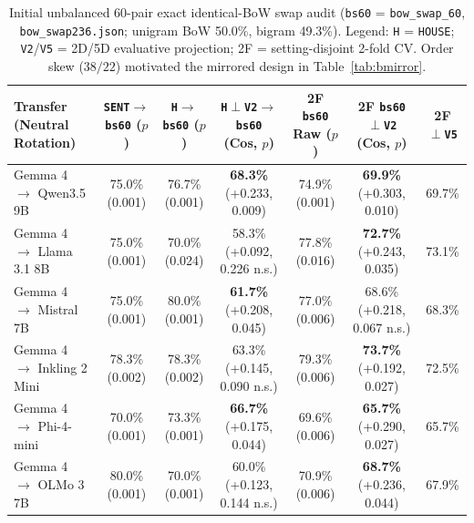 \documentclass[conference]{IEEEtran}
\begin{document}
\begin{table}[t]
\centering
\caption{Initial unbalanced 60-pair exact identical-BoW swap audit (\texttt{bs60} = \texttt{bow\_swap\_60}, \texttt{bow\_swap236.json}; unigram BoW 50.0\%, bigram 49.3\%). Legend: \texttt{H} = \texttt{HOUSE}; \texttt{V2}/\texttt{V5} = 2D/5D evaluative projection; 2F = setting-disjoint 2-fold CV. Order skew ($38/22$) motivated the mirrored design in Table~\ref{tab:bmirror}.}
\label{tab:bswap}
\scriptsize
\setlength{\tabcolsep}{3.0pt}
\begin{tabular}{@{}lcccccc@{}}
\toprule
\textbf{Transfer (Neutral Rotation)} & \textbf{\texttt{SENT}$\to$\texttt{bs60} ($p$)} & \textbf{\texttt{H}$\to$\texttt{bs60} ($p$)} & \textbf{\texttt{H}$\perp$\texttt{V2}$\to$\texttt{bs60} (Cos, $p$)} & \textbf{2F \texttt{bs60} Raw ($p$)} & \textbf{2F \texttt{bs60}$\perp$\texttt{V2} (Cos, $p$)} & \textbf{2F $\perp$\texttt{V5}} \\
\midrule
Gemma 4 $\to$ Qwen3.5 9B & 75.0\% (0.001) & 76.7\% (0.001) & \textbf{68.3\%} (+0.233, 0.009) & 74.9\% (0.001) & \textbf{69.9\%} (+0.303, 0.010) & 69.7\% \\
Gemma 4 $\to$ Llama 3.1 8B & 75.0\% (0.001) & 70.0\% (0.024) & 58.3\% (+0.092, 0.226 n.s.) & 77.8\% (0.016) & \textbf{72.7\%} (+0.243, 0.035) & 73.1\% \\
Gemma 4 $\to$ Mistral 7B & 75.0\% (0.001) & 80.0\% (0.001) & \textbf{61.7\%} (+0.208, 0.045) & 77.0\% (0.006) & 68.6\% (+0.218, 0.067 n.s.) & 68.3\% \\
Gemma 4 $\to$ Inkling 2 Mini & 78.3\% (0.002) & 78.3\% (0.002) & 63.3\% (+0.145, 0.090 n.s.) & 79.3\% (0.006) & \textbf{73.7\%} (+0.192, 0.027) & 72.5\% \\
Gemma 4 $\to$ Phi-4-mini & 70.0\% (0.001) & 73.3\% (0.001) & \textbf{66.7\%} (+0.175, 0.044) & 69.6\% (0.006) & \textbf{65.7\%} (+0.290, 0.027) & 65.7\% \\
Gemma 4 $\to$ OLMo 3 7B & 80.0\% (0.001) & 70.0\% (0.001) & 60.0\% (+0.123, 0.144 n.s.) & 70.9\% (0.006) & \textbf{68.7\%} (+0.236, 0.044) & 67.9\% \\
\bottomrule
\end{tabular}
\end{table}
\end{document}
